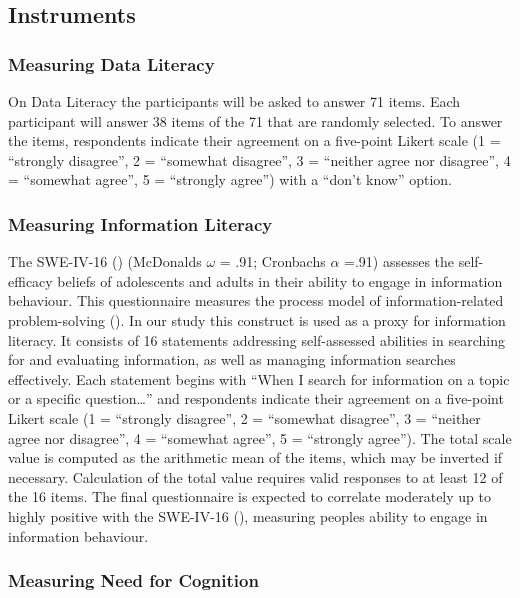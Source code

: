 \documentclass[
  12pt,
  a4paper,
  twoside]{article}
\begin{document}
\subsection{Instruments}\label{instruments}

\subsubsection{Measuring Data Literacy}\label{measuring-data-literacy}

On Data Literacy the participants will be asked to answer 71
items. Each participant will answer 38 items of the 71 that are randomly selected.
To answer the items, respondents indicate their agreement on a five-point Likert
scale (1 = ``strongly disagree'', 2 = ``somewhat disagree'', 3 = ``neither agree nor
disagree'', 4 = ``somewhat agree'', 5 = ``strongly agree'') with a ``don't know''
option.

\subsubsection{Measuring Information Literacy}\label{measuring-information-literacy}

The SWE-IV-16 () (McDonalds \(\omega\) = .91; Cronbachs \(\alpha\) =.91) assesses the self-efficacy beliefs
of adolescents and adults in their ability to engage in information behaviour. This
questionnaire measures the process model of information-related problem-solving
(). In our study this construct is used as a proxy for information literacy.
It consists of 16 statements addressing self-assessed
abilities in searching for and evaluating information, as well as managing
information searches effectively. Each statement begins with ``When I search for
information on a topic or a specific question\ldots{}'' and respondents indicate their
agreement on a five-point Likert scale (1 = ``strongly disagree'', 2 = ``somewhat
disagree'', 3 = ``neither agree nor disagree'', 4 = ``somewhat agree'', 5 = ``strongly
agree''). The total scale value is computed as the arithmetic
mean of the items, which may be inverted if necessary. Calculation of the total value
requires valid responses to at least 12 of the 16 items. The final questionnaire is expected to correlate moderately up to highly positive with the SWE-IV-16 (), measuring peoples ability to engage in information behaviour.

\subsubsection{Measuring Need for Cognition}\label{measuring-need-for-cognition}
\end{document}

